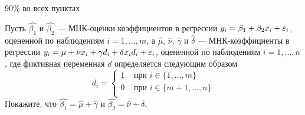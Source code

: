\documentclass[pdftex,11pt,openany]{book}\usepackage[]{graphicx}\usepackage[]{color}
\begin{document}
\begin{solution}
90\% во всех пунктах
\end{solution}



\begin{problem}
Пусть $\hat{\beta_1}$ и $\hat{\beta_2}$ --- МНК-оценки коэффициентов в регрессии $y_i = \beta_1 + \beta_2 x_i + \varepsilon_i$, оцененной по наблюдениям $i = 1, \ldots, m$, а $\hat{\mu}$, $\hat{\nu}$, $\hat{\gamma}$ и $\hat{\delta}$ --- МНК-коэффициенты в регрессии $y_i = \mu + \nu x_i + \gamma d_i + \delta x_i d_i + \varepsilon_i$, оцененной по наблюдениям $i = 1, \ldots, n$, где фиктивная переменная $d$ определяется следующим образом
$$d_i = \begin{cases}
1 & \text{ при } i \in \{1, \ldots, m\} \\
0 & \text{ при } i \in \{m + 1, \ldots, n\} \\
\end{cases}$$
Покажите, что $\hat{\beta_1} = \hat{\mu} + \hat{\gamma}$ и $\hat{\beta_2} = \hat{\nu} + \hat{\delta}$.
\end{problem}
\end{document}
